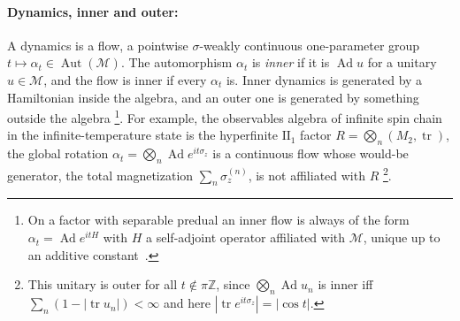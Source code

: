 \documentclass[a4paper,11pt]{article}
\theoremstyle{definition}
\begin{document}
\paragraph{Dynamics, inner and outer:}
A dynamics is a flow, a pointwise $\sigma$-weakly continuous one-parameter group $t\mapsto\alpha_t\in\operatorname{Aut}(\mathcal M)$. The automorphism $\alpha_t$ is \emph{inner} if it is $\operatorname{Ad}u$ for a unitary $u\in\mathcal M$, and the flow is inner if every $\alpha_t$ is. Inner dynamics is generated by a Hamiltonian inside the algebra, and an outer one is generated by something outside the algebra \footnote{On a factor with separable predual an inner flow is always of the form $\alpha_t=\operatorname{Ad}e^{itH}$ with $H$ a self-adjoint operator affiliated with $\mathcal M$, unique up to an additive constant~\cite{Kallman1971}.}. For example, the observables algebra of infinite spin chain in the infinite-temperature state is the hyperfinite $\mathrm{II}_1$ factor $R=\bigotimes_n(M_2,\operatorname{tr})$, the global rotation $\alpha_t=\bigotimes_n\operatorname{Ad}e^{it\sigma_z}$ is a continuous flow whose would-be generator, the total magnetization $\sum_n\sigma_z^{(n)}$, is not affiliated with $R$ \footnote{This unitary is outer for all $t\notin\pi\mathbb Z$, since $\bigotimes_n\operatorname{Ad}u_n$ is inner iff $\sum_n(1-|\operatorname{tr}u_n|)<\infty$ and here $|\operatorname{tr}e^{it\sigma_z}|=|\cos t|$.}.

\end{document}
